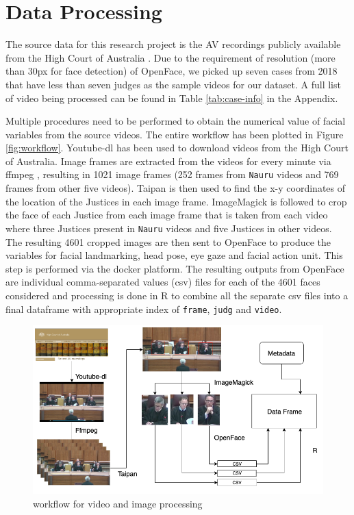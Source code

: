 \documentclass{monashthesis}
\begin{document}
\hypertarget{data-processing}{%
\section{Data Processing}\label{data-processing}}

The source data for this research project is the AV recordings publicly available from the High Court of Australia \autocite{highcourtau}. Due to the requirement of resolution (more than 30px for face detection) of OpenFace, we picked up seven cases from 2018 that have less than seven judges as the sample videos for our dataset. A full list of video being processed can be found in Table \ref{tab:case-info} in the Appendix.

Multiple procedures need to be performed to obtain the numerical value of facial variables from the source videos. The entire workflow has been plotted in Figure \ref{fig:workflow}. Youtube-dl \autocite{youtube-dl} has been used to download videos from the High Court of Australia\autocite{highcourtau}. Image frames are extracted from the videos for every minute via ffmpeg \autocite{ffmpeg}, resulting in 1021 image frames (252 frames from \texttt{Nauru} videos and 769 frames from other five videos). Taipan \autocite{Taipan} is then used to find the x-y coordinates of the location of the Justices in each image frame. ImageMagick \autocite{ImageMagick} is followed to crop the face of each Justice from each image frame that is taken from each video where three Justices present in \texttt{Nauru} videos and five Justices in other videos. The resulting 4601 cropped images are then sent to OpenFace \autocite{baltrusaitis2018openface} to produce the variables for facial landmarking, head pose, eye gaze and facial action unit. This step is performed via the docker platform. The resulting outputs from OpenFace are individual comma-separated values (csv) files for each of the 4601 faces considered and processing is done in R to combine all the separate csv files into a final dataframe with appropriate index of \texttt{frame}, \texttt{judg} and \texttt{video}.

\begin{figure}

{\centering \includegraphics[width=1\linewidth]{figures/workflow} 

}

\caption{workflow for video and image processing \label{fig:workflow}}\label{fig:unnamed-chunk-1}
\end{figure}
\end{document}
